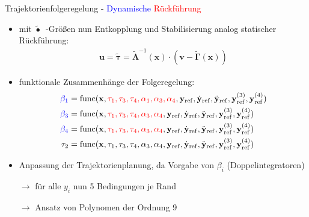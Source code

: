 \documentclass[
	ngerman,
	10pt,				%
	aspectratio=169 	%
]{beamer}
\begin{document}
\begin{frame}[t,fragile,label=trajektorienregelung_6]{\large Trajektorienfolgeregelung - \textcolor{blue}{Dynamische} \textcolor{red}{Rückführung}}
	
	\begin{itemize}
		\item mit $\tilde{\bullet}$~-Größen nun Entkopplung und Stabilisierung analog statischer Rückführung:
		\begin{align*}
			\mathbf{u} = \tilde{\boldsymbol{\tau}} = \tilde{\boldsymbol{\Lambda }}^{-1}(\mathbf{x}) \cdot (\mathbf{v} - \tilde{\boldsymbol{\Gamma}}(\mathbf{x}))
		\end{align*}
		\pause
		\item funktionale Zusammenhänge der Folgeregelung:
		\begin{align*}
			\textcolor{blue}{\beta_1} &= \mathrm{func}(\mathbf{x}, \textcolor{red}{\tau_1, \tau_3, \tau_4, \alpha_1, \alpha_3, \alpha_4}, \mathbf{y}_{\mathrm{ref}}, \dot{\mathbf{y}}_{\mathrm{ref}}, \ddot{\mathbf{y}}_{\mathrm{ref}}, \mathbf{y}_{\mathrm{ref}}^{(3)}, \mathbf{y}_{\mathrm{ref}}^{(4)}) \\
			\textcolor{blue}{\beta_3} &= \mathrm{func}(\mathbf{x}, \textcolor{red}{\tau_1, \tau_3, \tau_4, \alpha_3, \alpha_4}, \mathbf{y}_{\mathrm{ref}}, \dot{\mathbf{y}}_{\mathrm{ref}}, \ddot{\mathbf{y}}_{\mathrm{ref}}, \mathbf{y}_{\mathrm{ref}}^{(3)}, \mathbf{y}_{\mathrm{ref}}^{(4)}) \\
			\textcolor{blue}{\beta_4} &= \mathrm{func}(\mathbf{x}, \textcolor{red}{\tau_1, \tau_3, \tau_4, \alpha_3, \alpha_4}, \mathbf{y}_{\mathrm{ref}}, \dot{\mathbf{y}}_{\mathrm{ref}}, \ddot{\mathbf{y}}_{\mathrm{ref}}, \mathbf{y}_{\mathrm{ref}}^{(3)}, \mathbf{y}_{\mathrm{ref}}^{(4)}) \\
			\tau_2 &= \mathrm{func}(\mathbf{x}, \tau_1, \tau_3, \tau_4, \alpha_3, \alpha_4, \mathbf{y}_{\mathrm{ref}}, \dot{\mathbf{y}}_{\mathrm{ref}}, \ddot{\mathbf{y}}_{\mathrm{ref}}, \mathbf{y}_{\mathrm{ref}}^{(3)}, \mathbf{y}_{\mathrm{ref}}^{(4)})
		\end{align*}
		\pause
		\item Anpassung der Trajektorienplanung, da Vorgabe von $\beta_i$ (Doppelintegratoren)
		\pause
		\item[$\rightarrow$] für alle $y_i$ nun 5 Bedingungen je Rand
		\item[$\rightarrow$] Ansatz von Polynomen der Ordnung 9
	\end{itemize}
	
\end{frame}
\end{document}
